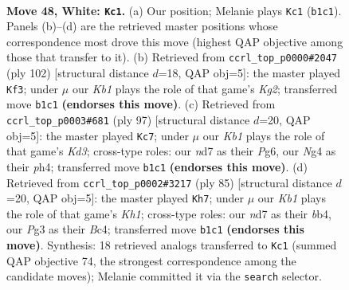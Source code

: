 \documentclass[11pt]{article}
\begin{document}
\clearpage

\begin{figure}[p]\centering
\begin{subfigure}{0.46\textwidth}\centering
\resizebox{\linewidth}{!}{%
\newchessgame
\chessboard[
  setfen={4k3/1b1n4/8/8/p2p2N1/P5P1/1PP5/1K6 w - - 14 48},
  showmover=false,
  pgfstyle=straightmove, color=movearrow, markmove={b1-c1}
]}
\caption{}
\end{subfigure}\hfill
\begin{subfigure}{0.46\textwidth}\centering
\resizebox{\linewidth}{!}{%
\newchessgame
\chessboard[
  setfen={8/5pp1/8/7p/N1nk1P2/6P1/5PK1/8 w - - 0 52},
  showmover=false,
  pgfstyle=straightmove, color=movearrow, markmove={g2-f3}
]}
\caption{}
\end{subfigure}
\\[4pt]
\begin{subfigure}{0.46\textwidth}\centering
\resizebox{\linewidth}{!}{%
\newchessgame
\chessboard[
  setfen={8/8/3k2p1/2p1pp2/P6P/3P2P1/4K3/8 b - - 0 49},
  showmover=false,
  pgfstyle=straightmove, color=movearrow, markmove={d6-c7}
]}
\caption{}
\end{subfigure}\hfill
\begin{subfigure}{0.46\textwidth}\centering
\resizebox{\linewidth}{!}{%
\newchessgame
\chessboard[
  setfen={7k/6p1/5p1p/8/1Bb1PNPP/1n6/5K2/8 b - - 0 43},
  showmover=false,
  pgfstyle=straightmove, color=movearrow, markmove={h8-h7}
]}
\caption{}
\end{subfigure}
\caption{\textbf{Move 48, White: \texttt{Kc1}.} (a) Our position; Melanie plays \texttt{Kc1} (\texttt{b1c1}). Panels (b)--(d) are the retrieved master positions whose correspondence most drove this move (highest QAP objective among those that transfer to it). (b) Retrieved from \texttt{ccrl\_top\_p0000\#2047} (ply 102) [structural distance $d$=18, QAP obj=5]: the master played \texttt{Kf3}; under $\mu$ our \emph{Kb1} plays the role of that game's \emph{Kg2}; transferred move \texttt{b1c1} \textbf{(endorses this move)}. (c) Retrieved from \texttt{ccrl\_top\_p0003\#681} (ply 97) [structural distance $d$=20, QAP obj=5]: the master played \texttt{Kc7}; under $\mu$ our \emph{Kb1} plays the role of that game's \emph{Kd3}; cross-type roles: our \emph{n}d7 as their \emph{P}g6, our \emph{N}g4 as their \emph{p}h4; transferred move \texttt{b1c1} \textbf{(endorses this move)}. (d) Retrieved from \texttt{ccrl\_top\_p0002\#3217} (ply 85) [structural distance $d$=20, QAP obj=5]: the master played \texttt{Kh7}; under $\mu$ our \emph{Kb1} plays the role of that game's \emph{Kh1}; cross-type roles: our \emph{n}d7 as their \emph{b}b4, our \emph{P}g3 as their \emph{B}c4; transferred move \texttt{b1c1} \textbf{(endorses this move)}. Synthesis: 18 retrieved analogs transferred to \texttt{Kc1} (summed QAP objective 74, the strongest correspondence among the candidate moves); Melanie committed it via the \texttt{search} selector.}
\label{fig:thought-m94}
\end{figure}
\end{document}

